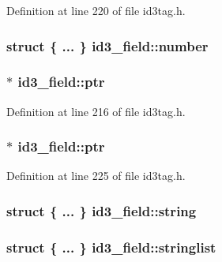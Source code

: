 Definition at line 220 of file id3tag.\+h.

\subsubsection[{\texorpdfstring{number}{number}}]{\setlength{\rightskip}{0pt plus 5cm}struct \{ ... \}   id3\+\_\+field\+::number}\hypertarget{unionid3__field_a19a3acc70277180a9399554cb0b6d642}{}\label{unionid3__field_a19a3acc70277180a9399554cb0b6d642}
\subsubsection[{\texorpdfstring{ptr}{ptr}}]{$\ast$ id3\+\_\+field\+::ptr}\hypertarget{unionid3__field_a623cefbabc200ba84aa1d662b74e23a5}{}\label{unionid3__field_a623cefbabc200ba84aa1d662b74e23a5}


Definition at line 216 of file id3tag.\+h.

\subsubsection[{\texorpdfstring{ptr}{ptr}}]{$\ast$ id3\+\_\+field\+::ptr}\hypertarget{unionid3__field_a8d320a55d1d8ca41524bfb36b97c1d72}{}\label{unionid3__field_a8d320a55d1d8ca41524bfb36b97c1d72}


Definition at line 225 of file id3tag.\+h.

\subsubsection[{\texorpdfstring{string}{string}}]{\setlength{\rightskip}{0pt plus 5cm}struct \{ ... \}   id3\+\_\+field\+::string}\hypertarget{unionid3__field_af889e17a0d6ed121541a52a3b6bab7dd}{}\label{unionid3__field_af889e17a0d6ed121541a52a3b6bab7dd}
\subsubsection[{\texorpdfstring{stringlist}{stringlist}}]{\setlength{\rightskip}{0pt plus 5cm}struct \{ ... \}   id3\+\_\+field\+::stringlist}\hypertarget{unionid3__field_abdf3ca8c234cd5182341bf4e00aed1d5}{}\label{unionid3__field_abdf3ca8c234cd5182341bf4e00aed1d5}

